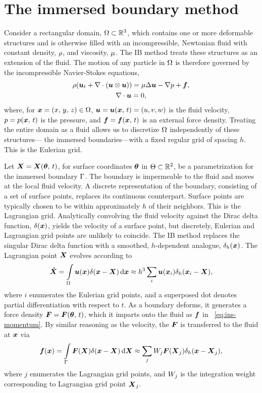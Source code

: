 \section{The immersed boundary method}\label{sec:ib}

Consider a rectangular domain, $\Omega\subset\mathbb{R}^3$, which contains one or more
deformable structures and is otherwise filled with an incompressible, Newtonian fluid
with constant density, $\rho$, and viscosity, $\mu$. The IB method treats
these structures as an extension of the fluid. The motion of any particle in $\Omega$ is
therefore governed by the incompressible Navier-Stokes equations,
\begin{gather}
    \density(\u_t + \div(\u\otimes\u)) = \viscosity\laplacian \u - \grad p + \f, \label{eq:ins-momentum} \\
    \div \u = 0, \label{eq:ins-incomp}
\end{gather}
where, for $\boldsymbol{x} = (x,\,y,\,z) \in \Omega$, $\boldsymbol{u} = \boldsymbol{u}(\boldsymbol{x},\,t) = (u, v, w)$ is the fluid
velocity, $p = p(\boldsymbol{x},\,t)$ is the pressure, and $\boldsymbol{f} = \boldsymbol{f}(\boldsymbol{x},\,t)$ is an external force
density. Treating the entire domain as a fluid allows us to discretize $\Omega$
independently of these structures--- the immersed boundaries---with a fixed regular grid
of spacing $h$. This is
the Eulerian grid.


Let $\boldsymbol{X} = \boldsymbol{X}(\boldsymbol{\theta},\,t)$, for surface coordinates $\boldsymbol{\theta}$ in $\Theta\subset\mathbb{R}^2$, be
a parametrization for the immersed boundary $\Gamma$. The boundary is impermeable to
the fluid and moves at the local fluid velocity. A discrete representation of the
boundary, consisting of a set of surface points, replaces its continuous counterpart.
Surface points are typically chosen to be within approximately $h$ of their neighbors.
This is the Lagrangian grid. Analytically convolving the fluid velocity against the Dirac
delta function, $\delta(\boldsymbol{x})$, yields the velocity of a surface point, but discretely,
Eulerian and Lagrangian grid points are unlikely to coincide. The IB method replaces the
singular Dirac delta function with a smoothed, $h$-dependent analogue, $\delta_h(\boldsymbol{x})$.
The Lagrangian point $\boldsymbol{X}$ evolves according to
\begin{equation}\label{eq:ib-interp}
    \vec{\dot{X}}
        = \int\limits_{\domain} \u(\x) \Dirac(\x-\X) \d\x
        \approx h^3 \sum_{i} \u(\x_i) \Dirac_h(\x_i-\X),
\end{equation}
where $i$ enumerates the Eulerian grid points, and a superposed dot denotes partial
differentiation with respect to $t$. As a boundary deforms, it generates a force density
$\boldsymbol{F} = \boldsymbol{F}(\boldsymbol{\theta},\,t)$, which it imparts onto the fluid as $\boldsymbol{f}$ in~ \eqref{eq:ins-momentum}.
By similar reasoning as the velocity, the $\boldsymbol{F}$ is transferred to the fluid at $\boldsymbol{x}$ via
\begin{equation}\label{eq:ib-spread}
        \f(\x)
        = \int\limits_{\interface} \F(\X)\Dirac(\x-\X) \d\X
        \approx \sum_{j} \weight[j]\F(\X_j) \Dirac_h(\x-\X_j),
\end{equation}
where $j$ enumerates the Lagrangian grid points, and $\weight[j]$ is the integration
weight corresponding to Lagrangian grid point $\boldsymbol{X}_j$.

